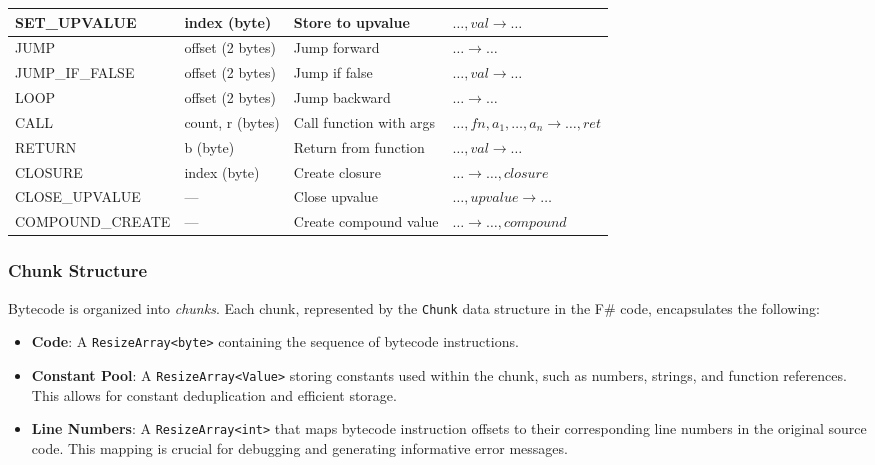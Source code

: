 \begin{table}[h]
\begin{tabularx}{\textwidth}{|X|X|X|X|}
        \hline
        SET\_UPVALUE & index (byte) & Store to upvalue & $\dots, val \rightarrow \dots$ \\
        \hline
        JUMP & offset (2 bytes) & Jump forward & $\dots \rightarrow \dots$ \\
        \hline
        JUMP\_IF\_FALSE & offset (2 bytes) & Jump if false & $\dots, val \rightarrow \dots$ \\
        \hline
        LOOP & offset (2 bytes) & Jump backward & $\dots \rightarrow \dots$ \\
        \hline
        CALL & count, r (bytes) & Call function with args & $\dots, fn, a_1, \dots, a_n \rightarrow \dots, ret$ \\
        \hline
        RETURN & b (byte) & Return from function & $\dots, val \rightarrow \dots$ \\
        \hline
        CLOSURE & index (byte) & Create closure & $\dots \rightarrow \dots, closure$ \\
        \hline
        CLOSE\_UPVALUE & --- & Close upvalue & $\dots, upvalue \rightarrow \dots$ \\
        \hline
        COMPOUND\_CREATE & --- & Create compound value & $\dots \rightarrow \dots, compound$ \\
        \hline
    \end{tabularx}
    \label{tab:instruction-set}
\end{table}

\subsubsection{Chunk Structure}

Bytecode is organized into \textit{chunks}.
Each chunk, represented by the \texttt{Chunk} data structure in the F\# code, encapsulates the following:

\begin{itemize}
    \item \textbf{Code}: A \texttt{ResizeArray<byte>} containing the sequence of bytecode instructions.
    \item \textbf{Constant Pool}: A \texttt{ResizeArray<Value>} storing constants used within the chunk, such as numbers, strings, and function references.
    This allows for constant deduplication and efficient storage.
    \item \textbf{Line Numbers}: A \texttt{ResizeArray<int>} that maps bytecode instruction offsets to their corresponding line numbers in the original source code.
    This mapping is crucial for debugging and generating informative error messages.
\end{itemize}


